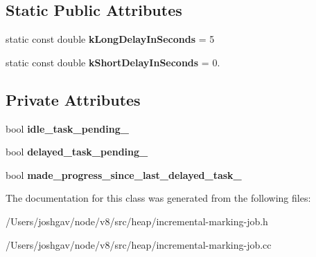 \subsection*{Static Public Attributes}
\begin{DoxyCompactItemize}
\item 
static const double {\bfseries k\+Long\+Delay\+In\+Seconds} = 5\hypertarget{classv8_1_1internal_1_1_incremental_marking_job_ad934edf365c8b948fcf72e2173a86ea6}{}\label{classv8_1_1internal_1_1_incremental_marking_job_ad934edf365c8b948fcf72e2173a86ea6}

\item 
static const double {\bfseries k\+Short\+Delay\+In\+Seconds} = 0.\hypertarget{classv8_1_1internal_1_1_incremental_marking_job_aaabbf1988f266c5f6537998fad1c8548}{}\label{classv8_1_1internal_1_1_incremental_marking_job_aaabbf1988f266c5f6537998fad1c8548}

\end{DoxyCompactItemize}
\subsection*{Private Attributes}
\begin{DoxyCompactItemize}
\item 
bool {\bfseries idle\+\_\+task\+\_\+pending\+\_\+}\hypertarget{classv8_1_1internal_1_1_incremental_marking_job_ae54c52ea426e96551e9dbc6b34f15ff6}{}\label{classv8_1_1internal_1_1_incremental_marking_job_ae54c52ea426e96551e9dbc6b34f15ff6}

\item 
bool {\bfseries delayed\+\_\+task\+\_\+pending\+\_\+}\hypertarget{classv8_1_1internal_1_1_incremental_marking_job_a74b9f98c48eaba06782ddf2462cffed7}{}\label{classv8_1_1internal_1_1_incremental_marking_job_a74b9f98c48eaba06782ddf2462cffed7}

\item 
bool {\bfseries made\+\_\+progress\+\_\+since\+\_\+last\+\_\+delayed\+\_\+task\+\_\+}\hypertarget{classv8_1_1internal_1_1_incremental_marking_job_a35e8740cf51d50dab8960f6f3017899c}{}\label{classv8_1_1internal_1_1_incremental_marking_job_a35e8740cf51d50dab8960f6f3017899c}

\end{DoxyCompactItemize}


The documentation for this class was generated from the following files\+:\begin{DoxyCompactItemize}
\item 
/\+Users/joshgav/node/v8/src/heap/incremental-\/marking-\/job.\+h\item 
/\+Users/joshgav/node/v8/src/heap/incremental-\/marking-\/job.\+cc\end{DoxyCompactItemize}
